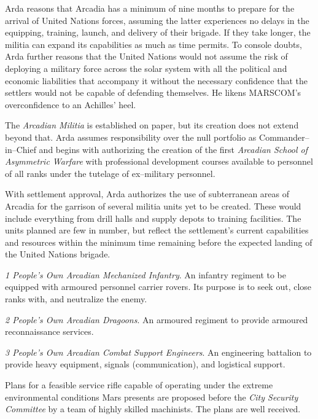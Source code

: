 Arda reasons that Arcadia has a minimum of nine months to prepare for the arrival of United Nations forces, assuming the latter experiences no delays in the equipping, training, launch, and delivery of their brigade. If they take longer, the militia can expand its capabilities as much as time permits. To console doubts, Arda further reasons that the United Nations would not assume the risk of deploying a military force across the solar system with all the political and economic liabilities that accompany it without the necessary confidence that the settlers would not be capable of defending themselves. He likens MARSCOM's overconfidence to an Achilles' heel.

The {\it Arcadian Militia} is established on paper, but its creation does not extend beyond that. Arda assumes responsibility over the null portfolio as Commander--in--Chief and begins with authorizing the creation of the first {\it Arcadian School of Asymmetric Warfare} with professional development courses available to personnel of all ranks under the tutelage of ex--military personnel.
\StopTimelineDate

With settlement approval, Arda authorizes the use of subterranean areas of Arcadia for the garrison of several militia units yet to be created. These would include everything from drill halls and supply depots to training facilities. The units planned are few in number, but reflect the settlement's current capabilities and resources within the minimum time remaining before the expected landing of the United Nations brigade.

\startitemize[4]
\item {\it 1 People's Own Arcadian Mechanized Infantry}. An infantry regiment to be equipped with armoured personnel carrier rovers. Its purpose is to seek out, close ranks with, and neutralize the enemy.

\item {\it 2 People's Own Arcadian Dragoons}. An armoured regiment to provide armoured reconnaissance services.

\item {\it 3 People's Own Arcadian Combat Support Engineers}. An engineering battalion to provide heavy equipment, signals (communication), and logistical support.
\stopitemize
\StopTimelineDate

Plans for a feasible service rifle capable of operating under the extreme environmental conditions Mars presents are proposed before the {\it City Security Committee} by a team of highly skilled machinists. The plans are well received. 

